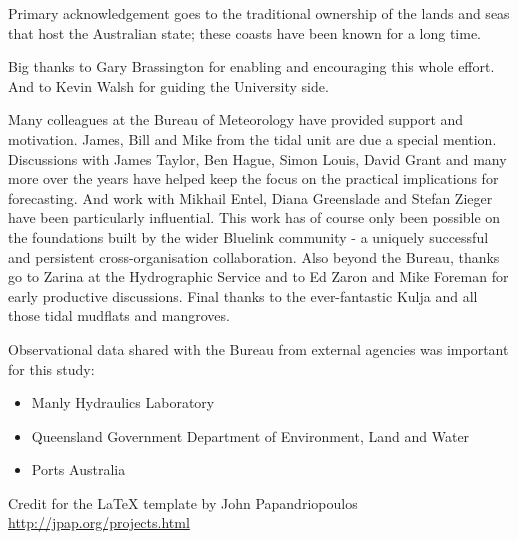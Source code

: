 
\begin{acknowledgements}

{\parindent0pt

Primary acknowledgement goes to the traditional ownership of the lands and seas that host the Australian state; these coasts have been known for a long time.
\newline{}
    
Big thanks to Gary Brassington for enabling and encouraging this whole effort.
And to Kevin Walsh for guiding the University side. 

\newline{}
Many colleagues at the Bureau of Meteorology have provided support and motivation. 
James, Bill and Mike from the tidal unit are due a special mention.    
Discussions with James Taylor, Ben Hague, Simon Louis, David Grant and many more over the years have helped keep the focus on the practical implications for forecasting.
And work with Mikhail Entel, Diana Greenslade and Stefan Zieger have been particularly influential.
\newline{}
This work has of course only been possible on the foundations built by the wider Bluelink community - a uniquely successful and persistent cross-organisation collaboration.
Also beyond the Bureau, thanks go to Zarina at the Hydrographic Service and to Ed Zaron and Mike Foreman for early productive discussions. 
\newline{}
Final thanks to the ever-fantastic Kulja and all those tidal mudflats and mangroves.  
\newline{}

Observational data shared with the Bureau from external agencies was important for this study:
\begin{itemize}
    \item Manly Hydraulics Laboratory %
    \item Queensland Government Department of Environment, Land and Water
    \item Ports Australia
\end{itemize}


Credit for the LaTeX template by John Papandriopoulos  \url{http://jpap.org/projects.html}

}   %
\end{acknowledgements}
